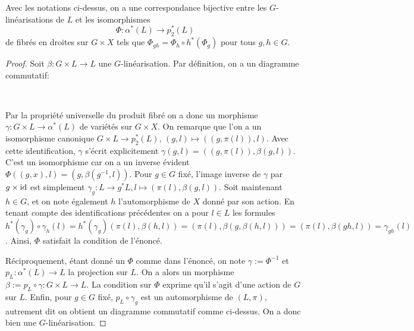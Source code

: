 \begin{lem}
Avec les notations ci-dessus, on a une correspondance bijective entre les $G$-linéarisations de $L$ et les isomorphismes
$$\Phi: \alpha^*(L)\rightarrow p_2^*(L)$$
de fibrés en droites sur $G\times X$ tels que $\Phi_{gh}=\Phi_h\circ h^*(\Phi_g)$ pour tous $g,h\in G$.
\end{lem}
\begin{proof}
Soit $\beta:G\times L\rightarrow L$ une $G$-linéarisation. Par définition, on a un diagramme commutatif:
	\begin{center}
	\\
	\end{center}
Par la propriété universelle du produit fibré on a donc un morphisme $\gamma:G\times L\rightarrow\alpha^*(L)$ de variétés sur $G\times X$. On remarque que l'on a un isomorphisme canonique $G\times L\rightarrow p_2^*(L),\, (g,l)\mapsto ((g,\pi (l)),l)$. Avec cette identification, $\gamma$ s'écrit explicitement $\gamma(g,l)=((g,\pi(l)),\beta(g,l))$. C'est un isomorphisme car on a un inverse évident $\Phi((g,x),l)=(g,\beta(g^{-1},l))$. Pour $g\in G$ fixé, l'image inverse de $\gamma$ par $g\times \operatorname{id}$ est simplement $\gamma_g:L\rightarrow g^*L, l\mapsto (\pi(l),\beta(g,l))$. Soit maintenant $h\in G$, et on note également $h$ l'automorphisme de $X$ donné par son action. En tenant compte des identifications précédentes on a pour $l\in L$ les formules $h^*(\gamma_g)\circ\gamma_h(l)=h^*(\gamma_g)(\pi(l),\beta(h,l))=(\pi(l),\beta(g,\beta(h,l)))=(\pi(l),\beta(gh,l))=\gamma_{gh}(l)$. Ainsi, $\Phi$ satisfait la condition de l'énoncé.

Réciproquement, étant donné un $\Phi$ comme dans l'énoncé, on note $\gamma:=\Phi^{-1}$ et $p_L:\alpha^*(L)\rightarrow L$ la projection sur $L$. On a alors un morphisme $\beta:=p_L\circ\gamma : G\times L \rightarrow L$. La condition sur $\Phi$ exprime qu'il s'agit d'une action de $G$  sur $L$. Enfin, pour $g\in G$ fixé, $p_L\circ \gamma_g$ est un automorphisme de $(L,\pi)$, autrement dit on obtient un diagramme commutatif comme ci-dessus. On a donc bien une $G$-linéarisation.
\end{proof}

